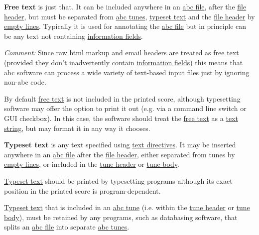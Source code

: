 \href{}{}\textbf{Free text} is just that. It can be included anywhere in
an \protect\hyperlink{abc_file_definition}{abc file}, after the
\protect\hyperlink{file_header_definition}{file header}, but must be
separated from \protect\hyperlink{abc_tune_definition}{abc tunes},
\protect\hyperlink{typeset_text_definition}{typeset text} and the
\protect\hyperlink{file_header_definition}{file header} by
\protect\hyperlink{empty_line_definition}{empty lines}. Typically it is
used for annotating the \protect\hyperlink{abc_file_definition}{abc
file} but in principle can be any text not containing
\protect\hyperlink{information_field_definition}{information fields}.

\emph{Comment:} Since raw html markup and email headers are treated as
\protect\hyperlink{free_text_definition}{free text} (provided they don't
inadvertently contain
\protect\hyperlink{information_field_definition}{information fields})
this means that abc software can process a wide variety of text-based
input files just by ignoring non-abc code.

By default \protect\hyperlink{free_text_definition}{free text} is not
included in the printed score, although typesetting software may offer
the option to print it out (e.g. via a command line switch or GUI
checkbox). In this case, the software should treat the
\protect\hyperlink{free_text_definition}{free text} as a
\protect\hyperlink{text_string_definition}{text string}, but may format
it in any way it chooses.

\href{}{}\textbf{Typeset text} is any text specified using
\protect\hyperlink{text_directives}{text directives}. It may be inserted
anywhere in an \protect\hyperlink{abc_file_definition}{abc file} after
the \protect\hyperlink{file_header_definition}{file header}, either
separated from tunes by \protect\hyperlink{empty_line_definition}{empty
lines}, or included in the
\protect\hyperlink{tune_header_definition}{tune header} or
\protect\hyperlink{tune_body_definition}{tune body}.

\protect\hyperlink{typeset_text_definition}{Typeset text} should be
printed by typesetting programs although its exact position in the
printed score is program-dependent.

\protect\hyperlink{typeset_text_definition}{Typeset text} that is
included in an \protect\hyperlink{abc_tune_definition}{abc tune} (i.e.
within the \protect\hyperlink{tune_header_definition}{tune header} or
\protect\hyperlink{tune_body_definition}{tune body}), must be retained
by any programs, such as databasing software, that splits an
\protect\hyperlink{abc_file_definition}{abc file} into separate
\protect\hyperlink{abc_tune_definition}{abc tunes}.

